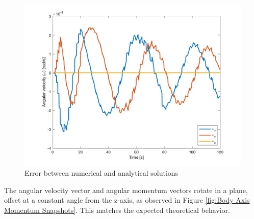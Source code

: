 \begin{figure}[H]
\centering
\includegraphics[scale=0.6]{Images/ps3_problem3.png}
\caption{Error between numerical and analytical solutions}
\label{fig:ps3_problem3}
\end{figure}

The angular velocity vector and angular momentum vectors rotate in a plane, offset at a constant angle from the z-axis, as observed in Figure \ref{fig:Body Axis Momentum Snapshots}. This matches the expected theoretical behavior.

